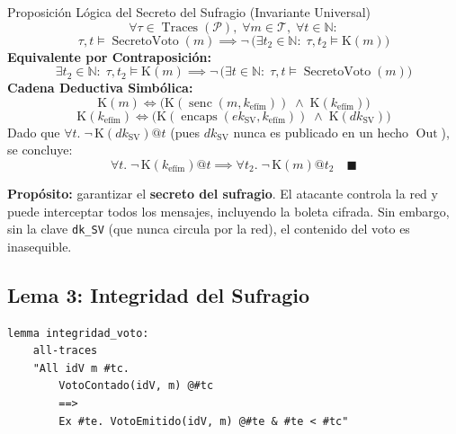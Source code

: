 \documentclass[12pt, a4paper, twoside, openright]{book}
\begin{document}
\begin{cajaLogica}{Proposici\'on L\'ogica del Secreto del Sufragio (Invariante Universal)}
  \[
    \forall \tau \in \operatorname{Traces}(\mathcal{P}),\; \forall m \in \mathcal{T},\; \forall t \in \mathbb{N}:
  \]
  \[
    \tau, t \models \operatorname{SecretoVoto}(m) \implies \neg\,\Big(\exists t_2 \in \mathbb{N}:\; \tau, t_2 \models \mathrm{K}(m)\Big)
  \]
  \textbf{Equivalente por Contraposici\'on:}
  \[
    \exists t_2 \in \mathbb{N}:\; \tau, t_2 \models \mathrm{K}(m) \implies \neg\,\Big(\exists t \in \mathbb{N}:\; \tau, t \models \operatorname{SecretoVoto}(m)\Big)
  \]
  \textbf{Cadena Deductiva Simb\'olica:}
  \[
    \mathrm{K}(m) \iff \Big(\mathrm{K}(\operatorname{senc}(m, k_{\text{ef\'im}})) \;\land\; \mathrm{K}(k_{\text{ef\'im}})\Big)
  \]
  \[
    \mathrm{K}(k_{\text{ef\'im}}) \iff \Big(\mathrm{K}(\operatorname{encaps}(\mathit{ek}_{\mathrm{SV}}, k_{\text{ef\'im}})) \;\land\; \mathrm{K}(\mathit{dk}_{\mathrm{SV}})\Big)
  \]
  Dado que $\forall t.\; \neg\,\mathrm{K}(\mathit{dk}_{\mathrm{SV}})@t$ (pues $\mathit{dk}_{\mathrm{SV}}$ nunca es publicado en un hecho $\operatorname{Out}$), se concluye:
  \[
    \forall t.\; \neg\,\mathrm{K}(k_{\text{ef\'im}})@t \implies \forall t_2.\; \neg\,\mathrm{K}(m)@t_2 \quad \blacksquare
  \]
\end{cajaLogica}

\textbf{Prop\'osito:} garantizar el \textbf{secreto del sufragio}.
El atacante controla la red y puede interceptar todos los mensajes,
incluyendo la boleta cifrada. Sin embargo, sin la clave \texttt{dk\_SV}
(que nunca circula por la red), el contenido del voto es inasequible.

\subsection{Lema 3: Integridad del Sufragio}

\begin{lstlisting}[caption={Integridad: todo voto contado fue leg\'itimamente emitido.}]
lemma integridad_voto:
    all-traces
    "All idV m #tc.
        VotoContado(idV, m) @#tc
        ==>
        Ex #te. VotoEmitido(idV, m) @#te & #te < #tc"
\end{lstlisting}
\end{document}

